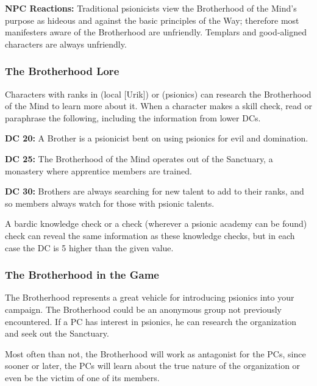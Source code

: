 \textbf{NPC Reactions:} Traditional psionicists view the Brotherhood of the Mind's purpose as hideous and against the basic principles of the Way; therefore most manifesters aware of the Brotherhood are unfriendly. Templars and good‐aligned characters are always unfriendly.

\subsubsection{The Brotherhood Lore}
Characters with ranks in  (local [Urik]) or  (psionics) can research the Brotherhood of the Mind to learn more about it. When a character makes a skill check, read or paraphrase the following, including the information from lower DCs.

\textbf{DC 20:} A Brother is a psionicist bent on using psionics for evil and domination.

\textbf{DC 25:} The Brotherhood of the Mind operates out of the Sanctuary, a monastery where apprentice members are trained.

\textbf{DC 30:} Brothers are always searching for new talent to add to their ranks, and so members always watch for those with psionic talents.

A bardic knowledge check or a  check (wherever a psionic academy can be found) check can reveal the same information as these knowledge checks, but in each case the DC is 5 higher than the given value.


\subsubsection{The Brotherhood in the Game}
The Brotherhood represents a great vehicle for introducing psionics into your campaign. The Brotherhood could be an anonymous group not previously encountered. If a PC has interest in psionics, he can research the organization and seek out the Sanctuary.

Most often than not, the Brotherhood will work as antagonist for the PCs, since sooner or later, the PCs will learn about the true nature of the organization or even be the victim of one of its members.